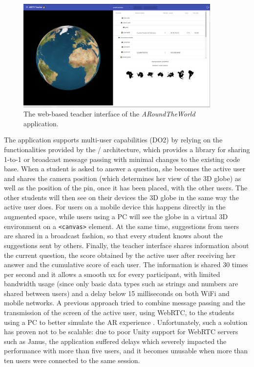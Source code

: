 \documentclass[pdflatex,sn-basic,iicol]{sn-jnl}%
\def\appname/{\textit{ARoundTheWorld}}
\begin{document}
\begin{figure}[t]
    \centering
    \includegraphics[width=0.9\textwidth]{imgs/Teacher_interface.png}
    \caption[The web-based teacher interface of the application.]{The web-based teacher interface of the \appname/ application.}
    \label{fig:teacher_interface}
\end{figure}

The application supports multi-user capabilities (DO2) by relying on the functionalities provided by the \clear/ architecture, which provides a library for sharing 1-to-1 or broadcast message passing \citep{10.1007/978-3-030-93907-6_106} with minimal changes to the existing code base. When a student is asked to answer a question, she becomes the active user and shares the camera position (which determines her view of the 3D globe) as well as the position of the pin, once it has been placed, with the other users. The other students will then see on their devices the 3D globe in the same way the active user does. For users on a mobile device this happens directly in the augmented space, while users using a PC will see the globe in a virtual 3D environment on a \texttt{\textless canvas\textgreater} element. At the same time, suggestions from users are shared in a broadcast fashion, so that every student knows about the suggestions sent by others. Finally, the teacher interface shares information about the current question, the score obtained by the active user after receiving her answer and the cumulative score of each user. The information is shared 30 times per second and it allows a smooth \gls{ux} for every participant, with limited bandwidth usage (since only basic data types such as strings and numbers are shared between users) and a delay below 15 milliseconds on both WiFi and mobile networks. A previous approach tried to combine message passing and the transmission of the screen of the active user, using WebRTC, to the students using a PC to better simulate the AR experience \citep{UnityRenderStreaming}. Unfortunately, such a solution has proven not to be scalable: due to poor Unity support for WebRTC servers such as Janus, the application suffered delays which severely impacted the performance with more than five users, and it becomes unusable when more than ten users were connected to the same session.
\end{document}
